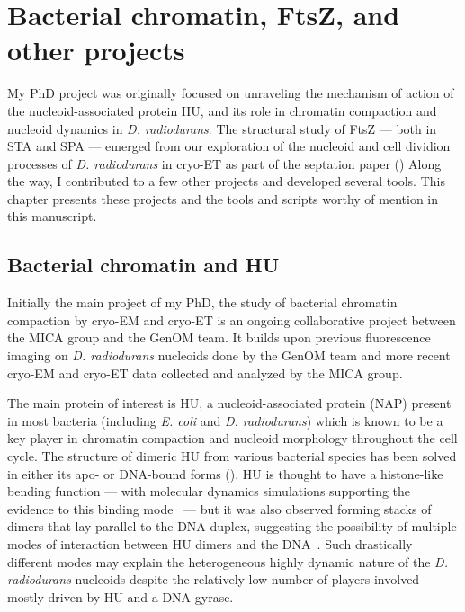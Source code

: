 \chapter{Bacterial chromatin, FtsZ, and other projects}\label{other_projects}

My PhD project was originally focused on unraveling the mechanism of action of the nucleoid-associated protein HU, and its role in chromatin compaction and nucleoid dynamics in \textit{D. radiodurans}.
The structural study of FtsZ --- both in STA and SPA --- emerged from our exploration of the nucleoid and cell dividion processes of \textit{D. radiodurans} in cryo-ET as part of the septation paper ()
Along the way, I contributed to a few other projects and developed several tools.
This chapter presents these projects and the tools and scripts worthy of mention in this manuscript.

\localtableofcontents

\section{Bacterial chromatin and HU}\label{hu}

Initially the main project of my PhD, the study of bacterial chromatin compaction by cryo-EM and cryo-ET is an ongoing collaborative project between the MICA group and the GenOM team.
It builds upon previous fluorescence imaging on \textit{D. radiodurans} nucleoids done by the GenOM team and more recent cryo-EM and cryo-ET data collected and analyzed by the MICA group.

The main protein of interest is HU, a nucleoid-associated protein (NAP) present in most bacteria (including \textit{E. coli} and \textit{D. radiodurans}) which is known to be a key player in chromatin compaction and nucleoid morphology throughout the cell cycle.
The structure of dimeric HU from various bacterial species has been solved in either its apo- or DNA-bound forms ().
HU is thought to have a histone-like bending function --- with molecular dynamics simulations supporting the evidence to this binding mode~\cite{hognonMolecularBasesDNA2019} --- but it was also observed forming stacks of dimers that lay parallel to the DNA duplex, suggesting the possibility of multiple modes of interaction between HU dimers and the DNA~\cite{hammelHUMultimerizationShift2016}.
Such drastically different modes may explain the heterogeneous highly dynamic nature of the \textit{D. radiodurans} nucleoids despite the relatively low number of players involved --- mostly driven by HU and a DNA-gyrase.

